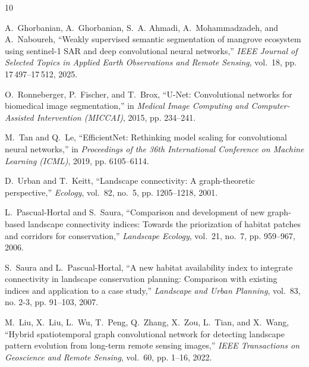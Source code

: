 \documentclass[conference]{IEEEtran}
\begin{document}
{\scriptsize
\begin{thebibliography}{10}
\providecommand{\url}[1]{#1}
\providecommand{\newblock}{\relax}

A.~Ghorbanian, A.~Ghorbanian, S.~A. Ahmadi, A.~Mohammadzadeh, and A.~Naboureh,
  ``Weakly supervised semantic segmentation of mangrove ecosystem using
  sentinel-1 {SAR} and deep convolutional neural networks,'' \emph{IEEE Journal
  of Selected Topics in Applied Earth Observations and Remote Sensing},
  vol.~18, pp. 17\,497--17\,512, 2025.

O.~Ronneberger, P.~Fischer, and T.~Brox, ``{U-Net}: {Convolutional} networks
  for biomedical image segmentation,'' in \emph{Medical Image Computing and
  Computer-Assisted Intervention (MICCAI)}, 2015, pp. 234--241.

M.~Tan and Q.~Le, ``{EfficientNet}: {Rethinking} model scaling for
  convolutional neural networks,'' in \emph{Proceedings of the 36th
  International Conference on Machine Learning (ICML)}, 2019, pp. 6105--6114.

D.~Urban and T.~Keitt, ``Landscape connectivity: {A} graph-theoretic
  perspective,'' \emph{Ecology}, vol.~82, no.~5, pp. 1205--1218, 2001.

L.~Pascual-Hortal and S.~Saura, ``Comparison and development of new graph-based
  landscape connectivity indices: {Towards} the priorization of habitat patches
  and corridors for conservation,'' \emph{Landscape Ecology}, vol.~21, no.~7,
  pp. 959--967, 2006.

S.~Saura and L.~Pascual-Hortal, ``A new habitat availability index to integrate
  connectivity in landscape conservation planning: {Comparison} with existing
  indices and application to a case study,'' \emph{Landscape and Urban
  Planning}, vol.~83, no. 2-3, pp. 91--103, 2007.

M.~Liu, X.~Liu, L.~Wu, T.~Peng, Q.~Zhang, X.~Zou, L.~Tian, and X.~Wang,
  ``Hybrid spatiotemporal graph convolutional network for detecting landscape
  pattern evolution from long-term remote sensing images,'' \emph{IEEE
  Transactions on Geoscience and Remote Sensing}, vol.~60, pp. 1--16, 2022.


\end{thebibliography}}
\end{document}
